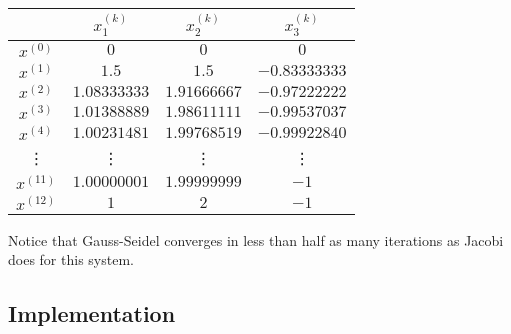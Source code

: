 \begin{center}
\begin{tabular}{c|ccc}
    & $x^{(k)}_1$ & $x^{(k)}_2$ & $x^{(k)}_3$ \\
    \hline
      $x^{(0)}$ & $0$ & $0$ & $0$ \\
      $x^{(1)}$ & $1.5$ & $1.5$ & $-0.83333333$ \\
      $x^{(2)}$ & $1.08333333$ & $1.91666667$ & $-0.97222222$ \\
      $x^{(3)}$ & $1.01388889$ & $1.98611111$ & $-0.99537037$ \\
      $x^{(4)}$ & $1.00231481$ & $1.99768519$ & $-0.99922840$ \\
      \vdots    & \vdots       & \vdots       & \vdots     \\
      $x^{(11)}$ & $1.00000001$ & $1.99999999$ & $-1$ \\
      $x^{(12)}$ & $1$ & $2$ & $-1$ \\
\end{tabular}
\end{center}
Notice that Gauss-Seidel converges in less than half as many iterations as Jacobi does for this system.

\subsection*{Implementation} %


